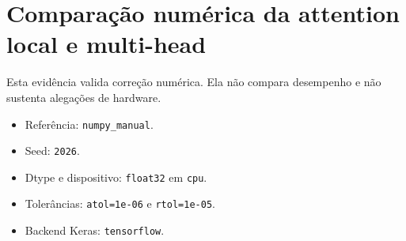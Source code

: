 \chapter{Comparação numérica da attention local e multi-head}

\begin{icquote}
Esta evidência valida correção numérica. Ela não compara desempenho e não sustenta alegações de hardware.
\end{icquote}

\begin{itemize}
\item Referência: \texttt{numpy\_\allowbreak{}manual}.
\item Seed: \texttt{2026}.
\item Dtype e dispositivo: \texttt{float32} em \texttt{cpu}.
\item Tolerâncias: \texttt{atol=1e-06} e \texttt{rtol=1e-05}.
\item Backend Keras: \texttt{tensorflow}.
\end{itemize}

